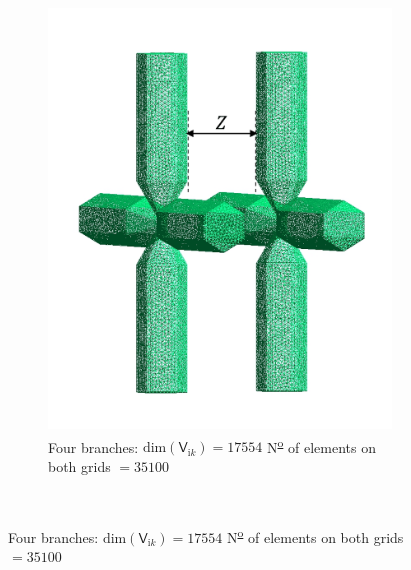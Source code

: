 \begin{figure}[H]
\begin{subfigure}{0.3\linewidth}
                \includegraphics[scale = 0.4]{figures/4branches}
                \caption{Four branches: $\text{dim}(\mathsf{V}_{\mathrm{i}k}) = 17554$ \newline N\textsuperscript{\underline{o}} of elements on both grids $ = 35100$}
                \end{subfigure}\\[1ex]
    \centering

\end{figure}
